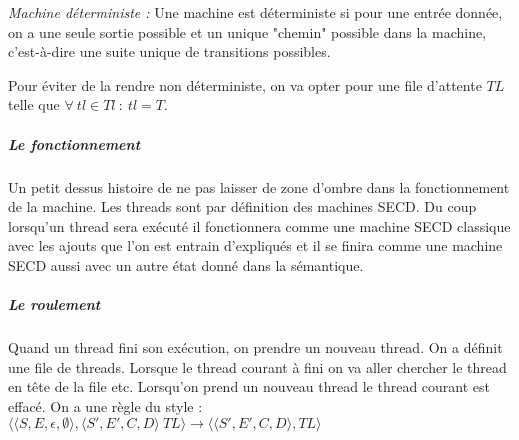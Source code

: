 \documentclass[10pt,a4paper]{report}
\begin{document}
	\textit{Machine déterministe :} Une machine est déterministe si pour une entrée donnée, on a une seule sortie possible et un unique "chemin" possible dans la machine, c'est-à-dire une suite unique de transitions possibles.
	\medbreak
	
	Pour éviter de la rendre non déterministe, on va opter pour une file d'attente $TL$ telle que $\forall~tl \in Tl~:~tl = T$.
	\bigbreak
	
	
	\subparagraph{Le fonctionnement} 
	Un petit dessus histoire de ne pas laisser de zone d'ombre dans la fonctionnement de la machine. Les threads sont par définition des machines SECD. Du coup lorsqu'un thread sera exécuté il fonctionnera comme une machine SECD classique avec les ajouts que l'on est entrain d'expliqués et il se finira comme une machine SECD aussi avec un autre état donné dans la sémantique.
	\bigbreak
	
	
	\subparagraph{Le roulement}
	Quand un thread fini son exécution, on prendre un nouveau thread. On a définit une file de threads. Lorsque le thread courant à fini on va aller chercher le thread en tête de la file etc. Lorsqu'on prend un nouveau thread le thread courant est effacé. On a une règle du style : 
	\smallbreak
	$\langle \langle S,E,\epsilon,\emptyset\rangle,\langle S',E',C,D\rangle~TL\rangle
	\longrightarrow 
	\langle \langle S',E',C,D\rangle,TL\rangle$
	\bigbreak
	
\end{document}
